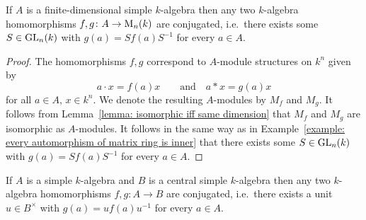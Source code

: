 \begin{corollary}
  \label{corollary: skolem noether for into matrix rings}
  If $A$ is a finite-dimensional simple $k$-algebra then any two $k$-algebra homomorphisms $f, g \colon A \to \operatorname{M}_n(k)$ are conjugated, i.e.\ there exists some $S \in \operatorname{GL}_n(k)$ with $g(a) = S f(a) S^{-1}$ for every $a \in A$.
\end{corollary}


\begin{proof}
  The homomorphisms $f, g$ correspond to $A$-module structures on $k^n$ given by
  \[
    a \cdot x = f(a)x
    \qquad\text{and}\quad
    a * x = g(a)x
  \]
  for all $a \in A$, $x \in k^n$.
  We denote the resulting $A$-modules by $M_f$ and $M_g$.
  It follows from Lemma~\ref{lemma: isomorphic iff same dimension} that $M_f$ and $M_g$ are isomorphic as $A$-modules.
  It follows in the same way as in Example~\ref{example: every automorphism of matrix ring is inner} that there exists some $S \in \operatorname{GL}_n(k)$ with $g(a) = S f(a) S^{-1}$ for every $a \in A$.
\end{proof}


\begin{theorem}
  If $A$ is a simple $k$-algebra and $B$ is a central simple $k$-algebra then any two $k$-algebra homomorphisms $f, g \colon A \to B$ are conjugated, i.e.\ there exists a unit $u \in B^\times$ with $g(a) = u f(a) u^{-1}$ for every $a \in A$.
\end{theorem}



